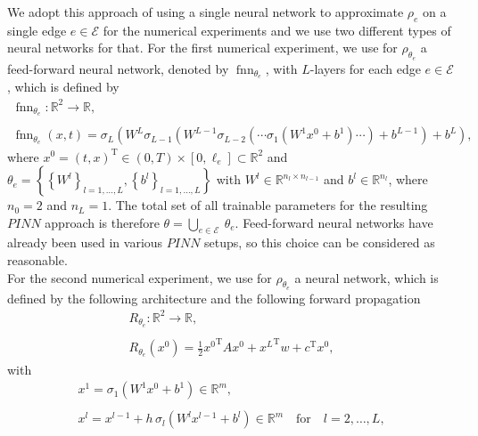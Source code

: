 We adopt this approach of using a single neural network to approximate $\rho_e$ on a single edge $e \in \mathcal{E}$ for the numerical experiments and we use two different types of neural networks for that. For the first numerical experiment, we use for $\rho_{\theta_e}$ a feed-forward neural network, denoted by $\operatorname{fnn}_{\theta_e}$, with $L$-layers for each edge $e \in \mathcal{E}$, which is defined by 
\begin{equation} 
    \label{one_for_each}
    \begin{gathered}
        \operatorname{fnn}_{\theta_e} \colon \mathbb{R}^2 \to \mathbb{R}, \\
        \\
        \operatorname{fnn}_{\theta_e}(x, t) = \sigma_L(W^L \sigma_{L-1}(W^{L-1}\sigma_{L-2}(\cdots \sigma_{1}(W^{1}x^0 +b^1) \cdots) + b^{L-1}) + b^{L}),
    \end{gathered} 
\end{equation} 
where $x^0 = (t, x)^{\mathrm{T}} \in (0, T) \times [0, \ell_e] \subset \mathbb{R}^2$ and $\theta_e = \left\{ \left\{ W^l \right\}_{l = 1, \ldots, L}, \left\{ b^l \right\}_{l = 1, \ldots, L} \right\}$ with $W^l \in \mathbb{R}^{n_l \times n_{l-1}}$ and $b^l \in \mathbb{R}^{n_l}$, where $n_0 = 2$ and $n_L = 1$. The total set of all trainable parameters for the resulting $PINN$ approach is therefore $\theta = \bigcup_{e \in \mathcal{E}} \ \theta_e$. Feed-forward neural networks have already been used in various $PINN$ setups, so this choice can be considered as reasonable.  \\
For the second numerical experiment, we use for $\rho_{\theta_e}$ a neural network, which is defined by the following architecture and the following forward propagation
\begin{equation} 
    \label{Resnet1}
    \begin{gathered}
        R_{\theta_e} \colon \mathbb{R}^2 \to \mathbb{R}, \\
        \\
        R_{\theta_e}(x^0) = \frac{1}{2} {x^0}^{\mathrm{T}} A x^0 + {x^{L}}^{\mathrm{T}} w + c^{\mathrm{T}} x^0,
    \end{gathered} 
\end{equation} 
with
\begin{equation}
    \label{Resnet2} 
    \begin{gathered}
        x^1 = \sigma_1(W^1 x^{0} + b^1) \in \mathbb{R}^m, \\
        \\
        x^l = x^{l-1} + h \, \sigma_l(W^l x^{l-1} + b^l) \in \mathbb{R}^m \quad \text{for} \quad l = 2, \ldots, L, 
    \end{gathered} 
\end{equation} 
